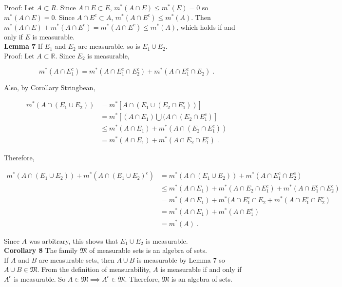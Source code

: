 \documentclass[a4paper]{article}
\begin{document}
Proof: Let $A\subset R$. Since $A\cap E \subset E$, $m^*(A\cap E) \leq m^*(E) = 0$ so $m^*(A\cap E) = 0$. Since $A\cap E^c \subset A$, $m^*(A\cap E^c) \leq m^*(A)$. Then $m^*(A\cap E) + m^*(A\cap E^c) = m^*(A\cap E^c) \leq m^*(A)$, which holds if and only if $E$ is measurable. \\


{\bf Lemma 7} If $E_1$ and $E_2$ are measurable, so is $E_1\cup E_2$.\\

Proof: Let $A\subset \mathbb{R}$. Since $E_2$ is measurable,

$$m^*(A\cap E_1^c) = m^*(A \cap E_1^c \cap E_2^c) + m^*(A \cap E_1^c \cap E_2) \;.$$ 

Also, by Corollary Stringbean,

\begin{align*}
m^*(A\cap (E_1 \cup E_2)) &= m^*\left[A\cap \left(E_1 \cup (E_2 \cap E_1^c)\right)\right]\\
&= m^*\left[(A\cap E_1)\bigcup (A\cap (E_2 \cap E_1^c)\right]\\
&\leq m^*\left(A\cap E_1\right) + m^*\left(A\cap (E_2 \cap E_1^c)\right)\\
&= m^*\left(A\cap E_1\right) + m^*\left(A\cap E_2 \cap E_1^c\right) \;.
\end{align*}

Therefore, 

\begin{align*}
m^*(A \cap (E_1\cup E_2)) + m^*(A\cap (E_1\cup E_2)^c) &= m^*(A \cap (E_1\cup E_2)) + m^*(A\cap E_1^c \cap E_2^c) \\
&\leq m^*\left(A\cap E_1\right) + m^*\left(A\cap E_2 \cap E_1^c\right) + m^*(A\cap E_1^c \cap E_2^c)\\
&= m^*\left(A\cap E_1\right) + m^*(A\cap E_1^c \cap E_2+ m^*(A\cap E_1^c \cap E_2^c)\\
&=m^*\left(A\cap E_1\right) + m^*(A \cap E_1^c)\\
&= m^*(A) \;.
\end{align*}

Since $A$ was arbitrary, this shows that $E_1 \cup E_2$ is measurable.\\

{\bf Corollary 8} The family $\mathfrak{M}$ of measurable sets is an algebra of sets. \\

If $A$ and $B$ are measurable sets, then $A\cup B$ is measurable by Lemma 7 so $A\cup B \in \mathfrak{M}$. From the definition of measurability, $A$ is measurable if and only if $A^c$ is measurable. So $A \in \mathfrak{M} \implies A^c \in \mathfrak{M}$. Therefore, $\mathfrak{M}$ is an algebra of sets. \\
\end{document}

